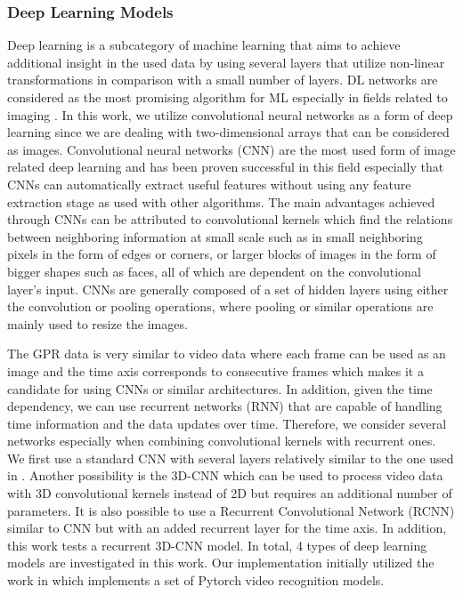 \documentclass{ieeeaccess}
\begin{document}
\subsubsection*{Deep Learning Models}
Deep learning is a subcategory of machine learning that aims to achieve additional insight in the used data by using several layers that utilize non-linear transformations in comparison with a small number of layers. DL networks are considered as the most promising algorithm for ML especially in fields related to imaging \cite{Shin2016}. In this work, we utilize convolutional neural networks as a form of deep learning since we are dealing with two-dimensional arrays that can be considered as images.
Convolutional neural networks (CNN) are the most used form of image related deep learning and has been proven successful in this field especially that CNNs can automatically extract useful features without using any feature extraction stage as used with other algorithms. The main advantages achieved through CNNs can be attributed to convolutional kernels which find the relations between neighboring information at small scale such as in small neighboring pixels in the form of edges or corners, or larger blocks of images in the form of bigger shapes such as faces, all of which are dependent on the convolutional layer's input. CNNs are generally composed of a set of hidden layers using either the convolution or pooling operations, where pooling or similar operations are mainly used to resize the images.

The GPR data is very similar to video data where each frame can be used as an image and the time axis corresponds to consecutive frames which makes it a candidate for using CNNs or similar architectures. In addition, given the time dependency, we can use recurrent networks (RNN) that are capable of handling time information and the data updates over time. Therefore, we consider several networks especially when combining convolutional kernels with recurrent ones. We first use a standard CNN with several layers relatively similar to the one used in \cite{Safatly2020}. Another possibility is the 3D-CNN which can be used to process video data with 3D convolutional kernels instead of 2D but requires an additional number of parameters. It is also possible to use a Recurrent Convolutional Network (RCNN) similar to CNN but with an added recurrent layer for the time axis. In addition, this work tests a recurrent 3D-CNN model. In total, 4 types of deep learning models are investigated in this work. Our implementation initially utilized the work in \cite{Zhang2018} which implements a set of Pytorch video recognition models.
\end{document}
